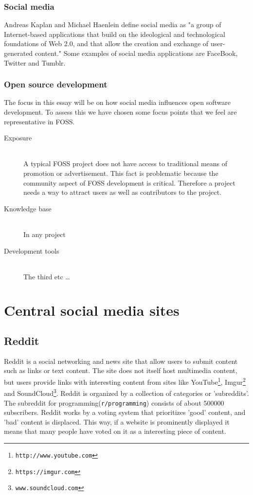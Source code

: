 \documentclass[a4paper,11pt]{article} %
\begin{document}
\subsubsection{Social media}
Andreas Kaplan and Michael Haenlein define social media as "a group of Internet-based applications that build on the ideological and technological foundations of Web 2.0, and that allow the creation and exchange of user-generated content."\cite{Kaplan201059} Some examples of social media applications are FaceBook, Twitter and Tumblr.
\subsubsection{Open source development}
The focus in this essay will be on how social media influences open software development. To assess
this we have chosen some focus points that we feel are representative in FOSS. 

\begin{description}
  \item[Exposure] \hfill \\
  A typical FOSS project does not have access to traditional means of
  promotion or advertisement. This fact is problematic because the community
  aspect of FOSS development is critical. Therefore a project needs a way to
  attract users as well as contributors to the project. 
  \item[Knowledge base] \hfill \\
  In any project 
  \item[Development tools] \hfill \\
  The third etc \ldots
\end{description}

\section{Central social media sites}


\subsection{Reddit}

Reddit is a social networking and news site that allow users to submit content
such as links or text content. The site does not itself host multimedia content,
but users provide links with interesting content from sites like YouTube\footnote{\texttt{http://www.youtube.com}}, Imgur\footnote{\texttt{https://imgur.com}} and
SoundCloud\footnote{\texttt{www.soundcloud.com}}.
Reddit is organized by a collection of categories or 'subreddits'. 
The subreddit for programming(\texttt{r/programming}) consists of about \num{500000}
subscribers. %
Reddit works by a voting system that prioritizes 'good' content, and 'bad'
content is displaced. This way, if a website is prominently displayed it means that
many people have voted on it as a interesting piece of content.
\end{document}
